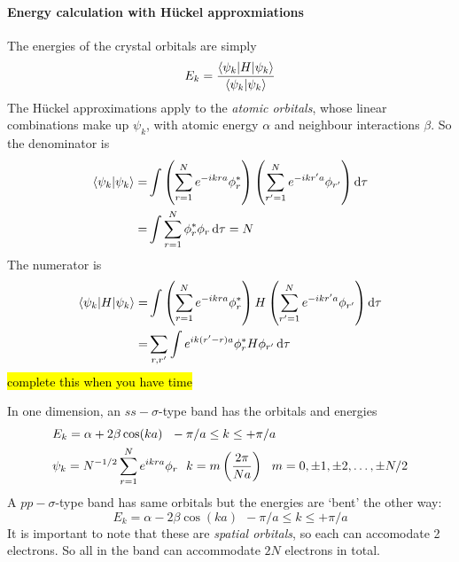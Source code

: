 \paragraph{Energy calculation with H{\" u}ckel approxmiations}
The energies of the crystal orbitals are simply
\begin{equation}
	E_k=\frac{\langle \psi_k | H|\psi_k \rangle}{\langle \psi_k | \psi_k \rangle}
\end{equation}
The H{\" u}ckel approximations apply to the \emph{atomic orbitals}, whose linear combinations make up $\psi_k$, with atomic energy $\alpha$ and neighbour interactions $\beta$. So the denominator is
\begin{equation}
\begin{aligned}
\lgl \psi_k | \psi_k \rgl=&\int \lf(\sum^N_{r=1}e^{-ikra}\phi_r^*\rt)\lf(\sum^N_{r'=1}e^{-ikr'a}\phi_{r'} \rt)\dif\tau\\
=&\int \sum^N_{r=1}\phi_r^*\phi_r\dif\tau=N
\end{aligned}
\end{equation}
The numerator is
\begin{equation}
\begin{aligned}
\lgl \psi_k | H|\psi_k \rgl=&\int \lf(\sum^N_{r=1}e^{-ikra}\phi_r^*\rt)H\lf(\sum^N_{r'=1}e^{-ikr'a}\phi_{r'} \rt)\dif\tau\\
=&\sum_{r,r'}\int e^{ik(r'-r)a}\phi_r^*H\phi_{r'}\dif\tau
\end{aligned}
\end{equation}
\hl{complete this when you have time}
\begin{thrm}
In one dimension, an $ss-\sigma$-type band has the orbitals and energies
\begin{equation}
\begin{aligned}
&E_k=\alpha+2\beta\cos(ka)\ \ -\pi/a\leq k\leq+\pi/a\\
&\psi_k=N^{-1/2}\sum_{r=1}^N e^{ikra}\phi_r\ \ k=m\lf(\frac{2\pi}{Na} \rt)\ \ m=0,\pm1,\pm2,\dots,\pm N/2
\end{aligned}
\end{equation}
A $pp-\sigma$-type band has same orbitals but the energies are `bent' the other way:
\begin{equation}
	E_k=\alpha-2\beta\cos(ka)\ \ -\pi/a\leq k\leq+\pi/a
\end{equation}
It is important to note that these are \emph{spatial orbitals}, so each can accomodate 2 electrons. So all in the band can accommodate $2N$ electrons in total.
\end{thrm}
